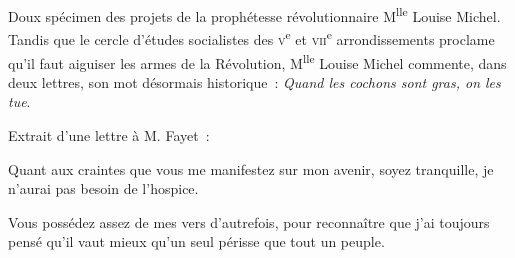 \documentclass[french,twoside]{book} %
\newenvironment{quoteblock}%
  {\begin{quoting}}
  {\end{quoting}}
\newenvironment{quotebar}{%
    \def\FrameCommand{{\color{rubric!10!}\vrule width 0.5em} \hspace{0.9em}}%
    \def\OuterFrameSep{\itemsep} %
    \MakeFramed {\advance\hsize-\width \FrameRestore}
  }%
  {%
    \endMakeFramed
  }
\renewenvironment{quoteblock}%
  {%
    \savenotes
    \setstretch{0.9}
    \normalfont
    \begin{quotebar}
  }
  {%
    \end{quotebar}
    \spewnotes
  }
\begin{document}
\begin{quoteblock}
 \noindent Doux spécimen des projets de la prophétesse révolutionnaire M\textsuperscript{lle} Louise Michel. Tandis que le cercle d’études socialistes des {\scshape v}\textsuperscript{e} et {\scshape vii}\textsuperscript{e} arrondissements proclame qu’il faut aiguiser les armes de la Révolution, M\textsuperscript{lle} Louise Michel commente, dans deux lettres, son mot désormais historique : \emph{Quand les cochons sont gras, on les tue}.
 \end{quoteblock}

\noindent Extrait d’une lettre à M. Fayet :\par

\begin{quoteblock}
 \noindent Quant aux craintes que vous me manifestez sur mon avenir, soyez tranquille, je n’aurai pas besoin de l’hospice.\par
 Vous possédez assez de mes vers d’autrefois, pour reconnaître que j’ai toujours pensé qu’il vaut mieux qu’un seul périsse que tout un peuple.
 \end{quoteblock}
\end{document}
